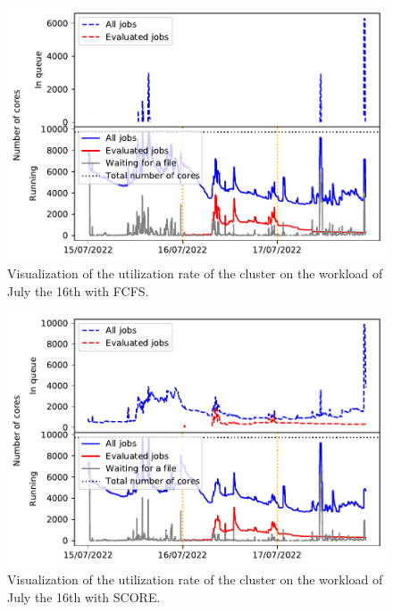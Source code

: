\documentclass[conference,10pt]{IEEEtran}
\begin{document}
\begin{figure}[H]\centering\includegraphics[scale=0.47]{../MBSS/plot/Cluster_usage/2022-07-16->2022-07-16_V10000_Fcfs_Used_nodes_Reduced_450_128_32_256_4_1024_core_by_core.pdf}\caption{Visualization of the utilization rate of the cluster on the workload of July the 16th with FCFS.}\label{07_16_cluster_usage_fcfs}\end{figure}
\begin{figure}[H]\centering\includegraphics[scale=0.47]{../MBSS/plot/Cluster_usage/2022-07-16->2022-07-16_V10000_Fcfs_with_a_score_x500_x1_x0_x0_Used_nodes_Reduced_450_128_32_256_4_1024_core_by_core.pdf}\caption{Visualization of the utilization rate of the cluster on the workload of July the 16th with SCORE.}\end{figure}
\end{document}
